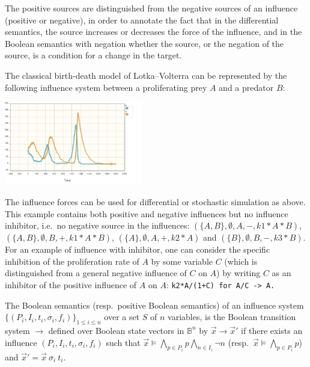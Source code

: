\documentclass{llncs}
\newcommand{\lra}{\longrightarrow}
\begin{document}
The positive sources are distinguished from the negative sources of an influence (positive or negative),
in order to annotate the fact that in the differential semantics,
the source increases or decreases the force of the influence,
and in the Boolean semantics with negation whether the source, or the negation of the source,
is a condition for a change in the target.


\begin{example}\label{ex:LVi}
   The classical birth-death model of Lotka--Volterra can be represented by the following
influence system between a proliferating prey $A$ and a predator $B$:
  

\vspace{-2cm}\hfill\includegraphics[width=0.45\textwidth]{LVstoch.png}

The influence forces can be used for differential or stochastic simulation as above.
This example contains both positive and negative influences but no influence inhibitor, i.e.~no negative source in the influences:
$(\{A, B\}, \emptyset, A, -, k1*A*B)$, $(\{A, B\}, \emptyset, B, +, k1*A*B)$, $(\{A\}, \emptyset, A, +, k2*A)$ and $(\{B\}, \emptyset, B, -, k3*B)$.
For an example of influence with inhibitor, one can consider the specific inhibition of the proliferation rate of $A$ by some variable $C$
(which is distinguished from a general negative influence of $C$ on $A$) by writing $C$ as an inhibitor of the positive influence of $A$ on $A$:
\verb|k2*A/(1+C) for A/C -> A.|
\end{example}



\begin{definition}
   The Boolean semantics (resp.~positive Boolean semantics) of an influence system $\{(P_i, I_i, t_i, \sigma_i,
   f_i)\}_{1\leq i\leq n}$
   over a set $S$ of $n$ variables,
   is the Boolean transition system $\lra$ defined over Boolean state vectors in $\mathbb{B}^n$
   by
   ${\vec x}\lra{\vec x'}$ if there exists an influence $(P_i, I_i, t_i, \sigma_i, f_i)$
   such that ${\vec x}\models \bigwedge_{p\in P_i} p\bigwedge_{n\in I_i} \neg n$ (resp.~${\vec x}\models \bigwedge_{p\in P_i} p$)
   and ${\vec x'} = {\vec x}\ \sigma_i\ t_i$.
\end{definition}
\end{document}
